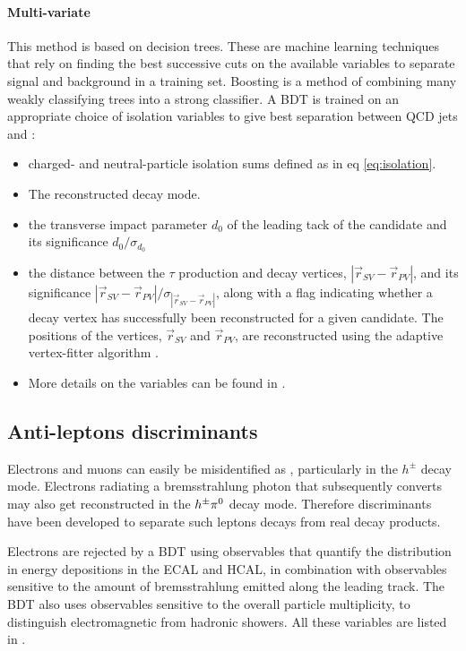 \paragraph{Multi-variate} This method is based on decision trees. These are machine learning techniques that rely on finding the best successive cuts on the available variables to separate signal and background in a training set. Boosting is a method of combining many weakly classifying trees into a strong classifier. A BDT is trained on an appropriate choice of isolation variables to give best separation between QCD jets and \tauh : 
    \begin{itemize}
        \item charged- and neutral-particle isolation sums defined as in eq \ref{eq:isolation}.
        \item The reconstructed decay mode.
        \item the transverse impact parameter $d_0$ of the leading tack of the \tauh candidate and its significance $d_0 / \sigma_{d_0}$
        \item the distance between the $\tau$ production and decay vertices, $|\Vec{r}_{SV} - \Vec{r}_{PV}|$, and its significance $|\Vec{r}_{SV} - \Vec{r}_{PV}|/\sigma_{|\Vec{r}_{SV} - \Vec{r}_{PV}|}$, along with a flag indicating whether a decay vertex has successfully been reconstructed for a given \tauh candidate. The positions of the vertices, $\Vec{r}_{SV}$ and $\Vec{r}_{PV}$, are reconstructed using the adaptive vertex-fitter algorithm \cite{Waltenberger_2007}.
        \item More details on the variables can be found in \cite{tauh_reconstruction}.
    \end{itemize}

\subsection{Anti-leptons discriminants}

Electrons and muons can easily be misidentified as \tauh, particularly in the $h^{\pm}$ decay mode. Electrons radiating a bremsstrahlung photon that subsequently converts may also get reconstructed in the $h^{\pm}\pi^{0}$ decay mode. Therefore discriminants have been developed to separate such leptons decays from real \tauh decay products.

Electrons are rejected by a BDT using observables that quantify the distribution in energy depositions in the ECAL and HCAL, in combination with observables sensitive to the amount of bremsstrahlung emitted along the leading track. The BDT also uses observables sensitive to the overall particle multiplicity, to distinguish electromagnetic from hadronic showers.
All these variables are listed in \cite{tauh_reconstruction}.
    
